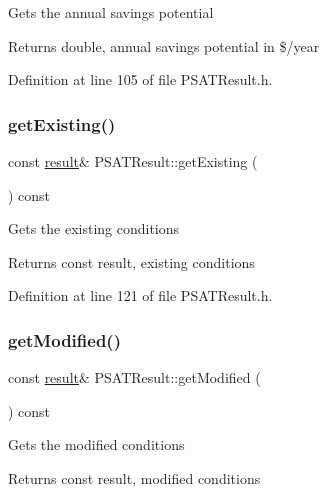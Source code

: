 Gets the annual savings potential \begin{DoxyReturn}{Returns}
double, annual savings potential in \$/year 
\end{DoxyReturn}


Definition at line 105 of file P\+S\+A\+T\+Result.\+h.

\mbox{\label{class_p_s_a_t_result_aa0140a6dc6c2682680633cbd90737278}} 
\subsubsection{\texorpdfstring{get\+Existing()}{getExisting()}}
{\footnotesize\ttfamily const \hyperlink{struct_p_s_a_t_result_1_1result}{result}\& P\+S\+A\+T\+Result\+::get\+Existing (\begin{DoxyParamCaption}{ }\end{DoxyParamCaption}) const\hspace{0.3cm}{\ttfamily [inline]}}

Gets the existing conditions \begin{DoxyReturn}{Returns}
const result, existing conditions 
\end{DoxyReturn}


Definition at line 121 of file P\+S\+A\+T\+Result.\+h.

\mbox{\label{class_p_s_a_t_result_a2a477033ed957ddac39ae1e5e7df38a8}} 
\subsubsection{\texorpdfstring{get\+Modified()}{getModified()}}
{\footnotesize\ttfamily const \hyperlink{struct_p_s_a_t_result_1_1result}{result}\& P\+S\+A\+T\+Result\+::get\+Modified (\begin{DoxyParamCaption}{ }\end{DoxyParamCaption}) const\hspace{0.3cm}{\ttfamily [inline]}}

Gets the modified conditions \begin{DoxyReturn}{Returns}
const result, modified conditions 
\end{DoxyReturn}


